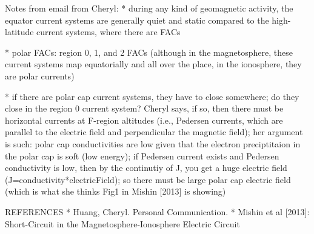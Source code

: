 
Notes from email from Cheryl:
* during any kind of geomagnetic activity, the equator current 
systems are generally quiet and static compared to the high-latitude 
current systems, where there are FACs

* polar FACs: region 0, 1, and 2 FACs (although in the magnetosphere,
these current systems map equatorially and all over the place, in the
ionosphere, they are polar currents)

* if there are polar cap current systems, they have to close somewhere;
do they close in the region 0 current system? Cheryl says, if so, then
there must be horizontal currents at F-region altitudes (i.e., Pedersen
currents, which are parallel to the electric field and perpendicular the
magnetic field); her argument is such: polar cap conductivities are low
given that the electron preciptitaion in the polar cap is soft (low
energy); if Pedersen current exists and Pedersen conductivity is low,
then by the continutiy of J, you get a huge electric field
(J=conductivity*electricField); so there must be large polar cap
electric field (which is what she thinks Fig1 in Mishin [2013] is
showing)






REFERENCES
* Huang, Cheryl. Personal Communication.
* Mishin et al [2013]: Short-Circuit in the Magnetosphere-Ionosphere
Electric Circuit
